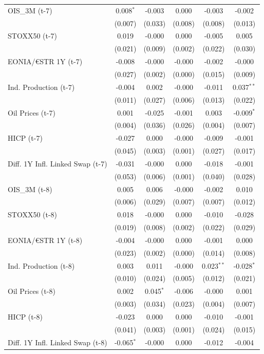 \begin{longtable}[t]{lccccc}
OIS\_3M (t-7) & 0.008$^{*}$ & -0.003 & 0.000 & -0.003 & -0.002\\
 & (0.007) & (0.033) & (0.008) & (0.008) & (0.013)\\
STOXX50 (t-7) & 0.019 & -0.000 & 0.000 & -0.005 & 0.005\\
 & (0.021) & (0.009) & (0.002) & (0.022) & (0.030)\\
EONIA/€STR 1Y (t-7) & -0.008 & -0.000 & -0.000 & -0.002 & -0.000\\
 & (0.027) & (0.002) & (0.000) & (0.015) & (0.009)\\
Ind. Production (t-7) & -0.004 & 0.002 & -0.000 & -0.011 & 0.037$^{**}$\\
 & (0.011) & (0.027) & (0.006) & (0.013) & (0.022)\\
Oil Prices (t-7) & 0.001 & -0.025 & -0.001 & 0.003 & -0.009$^{*}$\\
 & (0.004) & (0.036) & (0.026) & (0.004) & (0.007)\\
HICP (t-7) & -0.027 & 0.000 & -0.000 & -0.009 & -0.001\\
 & (0.045) & (0.003) & (0.001) & (0.027) & (0.017)\\
Diff. 1Y Infl. Linked Swap (t-7) & -0.031 & -0.000 & 0.000 & -0.018 & -0.001\\
 & (0.053) & (0.006) & (0.001) & (0.040) & (0.028)\\
OIS\_3M (t-8) & 0.005 & 0.006 & -0.000 & -0.002 & 0.010\\
 & (0.006) & (0.029) & (0.007) & (0.007) & (0.012)\\
STOXX50 (t-8) & 0.018 & -0.000 & 0.000 & -0.010 & -0.028\\
 & (0.019) & (0.008) & (0.002) & (0.022) & (0.029)\\
EONIA/€STR 1Y (t-8) & -0.004 & -0.000 & 0.000 & -0.001 & 0.000\\
 & (0.023) & (0.002) & (0.000) & (0.014) & (0.008)\\
Ind. Production (t-8) & 0.003 & 0.011 & -0.000 & 0.023$^{**}$ & -0.028$^{*}$\\
 & (0.010) & (0.024) & (0.005) & (0.012) & (0.021)\\
Oil Prices (t-8) & 0.002 & 0.045$^{*}$ & -0.006 & -0.000 & 0.001\\
 & (0.003) & (0.034) & (0.023) & (0.004) & (0.007)\\
HICP (t-8) & -0.023 & 0.000 & 0.000 & -0.010 & -0.001\\
 & (0.041) & (0.003) & (0.001) & (0.024) & (0.015)\\
Diff. 1Y Infl. Linked Swap (t-8) & -0.065$^{*}$ & -0.000 & 0.000 & -0.012 & -0.004\\

\end{longtable}
